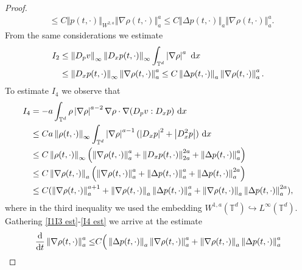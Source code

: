 \documentclass[11pt,reqno]{amsart}
\numberwithin{equation}{section}
\def\dd{{\rm d}}
\begin{document}
\begin{proof}
\begin{align}
&\leq C\left\Vert p(t,\cdot)\right\Vert_{W^{2,a}}\left\Vert \nabla \rho(t,\cdot)\right\Vert_{a}^{a}  \leq C\left\Vert \Delta p(t,\cdot)\right\Vert_{a}\left\Vert \nabla \rho(t,\cdot)\right\Vert_{a}^{a}  . \label{I1I3 est}     
\end{align}
From the same considerations we estimate  
\begin{align}
I_{2}&\leq \left\Vert D_{p}v\right\Vert_{\infty} \left\Vert D_{x}p(t,\cdot)\right\Vert_{\infty} \int_{\mathbb{T}^{d}} \left\vert \nabla \rho\right\vert^{a}\ \dd x \notag\\
&\leq \left\Vert D_{x}p(t,\cdot)\right\Vert_{\infty}\left\Vert \nabla \rho(t,\cdot)\right\Vert_{a}^{a}\leq C\left\Vert \Delta p(t,\cdot)\right\Vert_{a}\left\Vert \nabla \rho(t,\cdot)\right\Vert_{a}^{a}.  
\label{I2 est}      
\end{align}
To estimate $I_{4}$ we observe that
\begin{align}
I_{4}&=-a\int_{\mathbb{T}^{d}} \rho \left\vert \nabla \rho\right\vert^{a-2}\nabla \rho\cdot \nabla (D_{p}v:D_{x}p)\ \dd x \notag\\
&\leq Ca\left\Vert \rho(t,\cdot)\right\Vert_{\infty} \int_{\mathbb{T}^{d}} \left\vert \nabla \rho\right\vert^{a-1}(\left\vert D_{x}p\right\vert^{2}+\left\vert D_{x}^{2}p\right\vert)\ \dd x \notag\\
&\leq C \left\Vert \rho(t,\cdot)\right\Vert_{\infty}\left(\left\Vert \nabla \rho(t,\cdot)\right\Vert_{a}^{a}+\left\Vert D_{x}p(t,\cdot)\right\Vert_{2a}^{2a}  +\left\Vert \Delta p(t,\cdot)\right\Vert_{a}^{a}\right) \notag\\
&\leq C\left\Vert \nabla \rho(t,\cdot)\right\Vert_{a}\left(\left\Vert \nabla \rho(t,\cdot)\right\Vert_{a}^{a} +\left\Vert \Delta p(t,\cdot)\right\Vert_{a}^{a}+\left\Vert \Delta p(t,\cdot)\right\Vert_{a}^{2a} \right) \notag\\
& \leq C(\left\Vert \nabla \rho(t,\cdot)\right\Vert_{a}^{a+1}+\left\Vert \nabla \rho(t,\cdot)\right\Vert_{a}\left\Vert \Delta p(t,\cdot)\right\Vert_{a}^{a}+\left\Vert \nabla \rho(t,\cdot)\right\Vert_{a}\left\Vert \Delta p(t,\cdot)\right\Vert_{a}^{2a})   ,  \label{I4 est}    
\end{align}
where in the third inequality we used the embedding $W^{1,a}(\mathbb{T}^{d})\hookrightarrow L^{\infty}(\mathbb{T}^{d})$. 
Gathering \eqref{I1I3 est}-\eqref{I4 est} we arrive at the estimate 
\begin{align}
\frac{\dd}{\dd t}\left\Vert \nabla \rho(t,\cdot)\right\Vert_{a}^{a}\leq& C\Big(\left\Vert \Delta p(t,\cdot)\right\Vert_{a}\left\Vert \nabla \rho(t,\cdot)\right\Vert_{a}^{a}+\left\Vert \nabla \rho(t,\cdot)\right\Vert_{a}\left\Vert \Delta p(t,\cdot)\right\Vert_{a}^{a} \notag\\

\end{align}
\end{proof}
\end{document}
